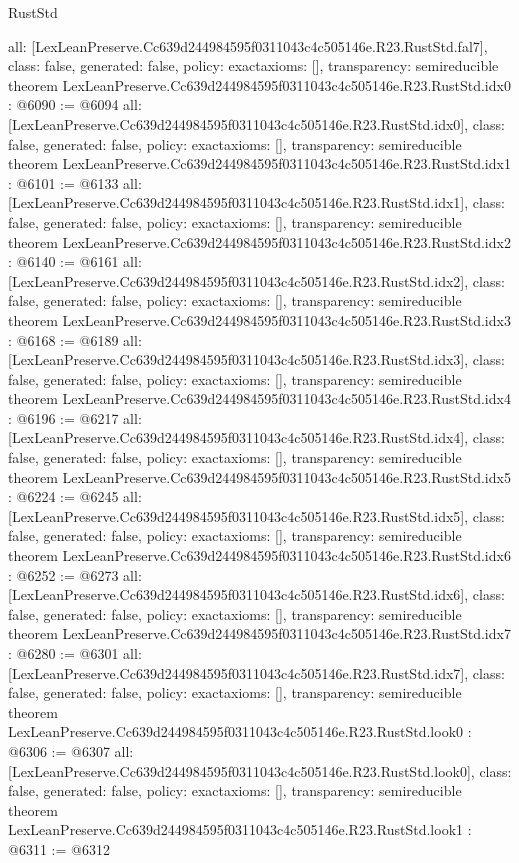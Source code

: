 \begin{lexlean}{RustStd}
\begin{coremodule}
{  all: [LexLeanPreserve.Cc639d244984595f0311043c4c505146e.R23.RustStd.fal7],
  class: false,
  generated: false,
  policy: exact{axioms: []},
  transparency: semireducible
}
theorem LexLeanPreserve.Cc639d244984595f0311043c4c505146e.R23.RustStd.idx0 : @6090 := @6094 {
  all: [LexLeanPreserve.Cc639d244984595f0311043c4c505146e.R23.RustStd.idx0],
  class: false,
  generated: false,
  policy: exact{axioms: []},
  transparency: semireducible
}
theorem LexLeanPreserve.Cc639d244984595f0311043c4c505146e.R23.RustStd.idx1 : @6101 := @6133 {
  all: [LexLeanPreserve.Cc639d244984595f0311043c4c505146e.R23.RustStd.idx1],
  class: false,
  generated: false,
  policy: exact{axioms: []},
  transparency: semireducible
}
theorem LexLeanPreserve.Cc639d244984595f0311043c4c505146e.R23.RustStd.idx2 : @6140 := @6161 {
  all: [LexLeanPreserve.Cc639d244984595f0311043c4c505146e.R23.RustStd.idx2],
  class: false,
  generated: false,
  policy: exact{axioms: []},
  transparency: semireducible
}
theorem LexLeanPreserve.Cc639d244984595f0311043c4c505146e.R23.RustStd.idx3 : @6168 := @6189 {
  all: [LexLeanPreserve.Cc639d244984595f0311043c4c505146e.R23.RustStd.idx3],
  class: false,
  generated: false,
  policy: exact{axioms: []},
  transparency: semireducible
}
theorem LexLeanPreserve.Cc639d244984595f0311043c4c505146e.R23.RustStd.idx4 : @6196 := @6217 {
  all: [LexLeanPreserve.Cc639d244984595f0311043c4c505146e.R23.RustStd.idx4],
  class: false,
  generated: false,
  policy: exact{axioms: []},
  transparency: semireducible
}
theorem LexLeanPreserve.Cc639d244984595f0311043c4c505146e.R23.RustStd.idx5 : @6224 := @6245 {
  all: [LexLeanPreserve.Cc639d244984595f0311043c4c505146e.R23.RustStd.idx5],
  class: false,
  generated: false,
  policy: exact{axioms: []},
  transparency: semireducible
}
theorem LexLeanPreserve.Cc639d244984595f0311043c4c505146e.R23.RustStd.idx6 : @6252 := @6273 {
  all: [LexLeanPreserve.Cc639d244984595f0311043c4c505146e.R23.RustStd.idx6],
  class: false,
  generated: false,
  policy: exact{axioms: []},
  transparency: semireducible
}
theorem LexLeanPreserve.Cc639d244984595f0311043c4c505146e.R23.RustStd.idx7 : @6280 := @6301 {
  all: [LexLeanPreserve.Cc639d244984595f0311043c4c505146e.R23.RustStd.idx7],
  class: false,
  generated: false,
  policy: exact{axioms: []},
  transparency: semireducible
}
theorem LexLeanPreserve.Cc639d244984595f0311043c4c505146e.R23.RustStd.look0 : @6306 := @6307 {
  all: [LexLeanPreserve.Cc639d244984595f0311043c4c505146e.R23.RustStd.look0],
  class: false,
  generated: false,
  policy: exact{axioms: []},
  transparency: semireducible
}
theorem LexLeanPreserve.Cc639d244984595f0311043c4c505146e.R23.RustStd.look1 : @6311 := @6312 {
}
\end{coremodule}
\end{lexlean}
